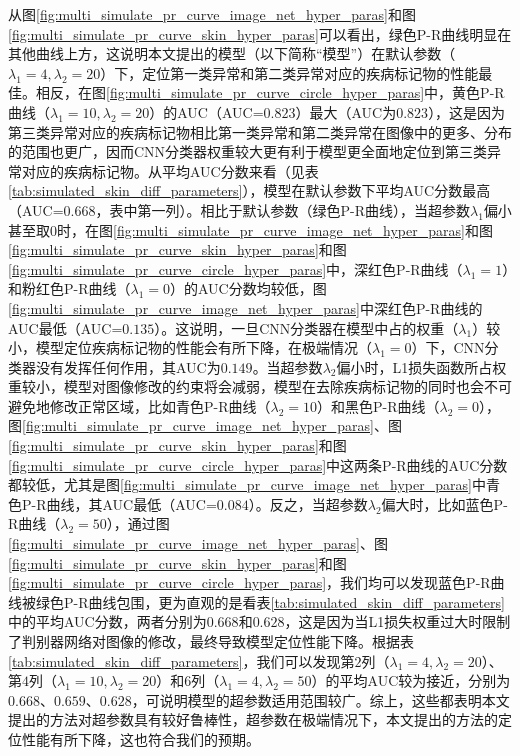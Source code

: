 从图\ref{fig:multi_simulate_pr_curve_image_net_hyper_paras}和图\ref{fig:multi_simulate_pr_curve_skin_hyper_paras}可以看出，绿色P-R曲线明显在其他曲线上方，这说明本文提出的模型（以下简称“模型”）在默认参数（$\lambda_{1}=4,\lambda_{2}=20$）下，定位第一类异常和第二类异常对应的疾病标记物的性能最佳。相反，在图\ref{fig:multi_simulate_pr_curve_circle_hyper_paras}中，黄色P-R曲线（$\lambda_{1}=10,\lambda_{2}=20$）的AUC（AUC=$0.823$）最大（AUC为$0.823$），这是因为第三类异常对应的疾病标记物相比第一类异常和第二类异常在图像中的更多、分布的范围也更广，因而CNN分类器权重较大更有利于模型更全面地定位到第三类异常对应的疾病标记物。从平均AUC分数来看（见表\ref{tab:simulated_skin_diff_parameters}），模型在默认参数下平均AUC分数最高（AUC=$0.668$，表中第一列）。相比于默认参数（绿色P-R曲线），当超参数$\lambda_{1}$偏小甚至取$0$时，在图\ref{fig:multi_simulate_pr_curve_image_net_hyper_paras}和图\ref{fig:multi_simulate_pr_curve_skin_hyper_paras}和图\ref{fig:multi_simulate_pr_curve_circle_hyper_paras}中，深红色P-R曲线（$\lambda_{1}=1$）和粉红色P-R曲线（$\lambda_{1}=0$）的AUC分数均较低，图\ref{fig:multi_simulate_pr_curve_image_net_hyper_paras}中深红色P-R曲线的AUC最低（AUC=$0.135$）。这说明，一旦CNN分类器在模型中占的权重（$\lambda_{1}$）较小，模型定位疾病标记物的性能会有所下降，在极端情况（$\lambda_{1}=0$）下，CNN分类器没有发挥任何作用，其AUC为$0.149$。当超参数$\lambda_{2}$偏小时，L1损失函数所占权重较小，模型对图像修改的约束将会减弱，模型在去除疾病标记物的同时也会不可避免地修改正常区域，比如青色P-R曲线（$\lambda_{2}=10$）和黑色P-R曲线（$\lambda_2=0$），图\ref{fig:multi_simulate_pr_curve_image_net_hyper_paras}、图\ref{fig:multi_simulate_pr_curve_skin_hyper_paras}和图\ref{fig:multi_simulate_pr_curve_circle_hyper_paras}中这两条P-R曲线的AUC分数都较低，尤其是图\ref{fig:multi_simulate_pr_curve_image_net_hyper_paras}中青色P-R曲线，其AUC最低（AUC=$0.084$）。反之，当超参数$\lambda_{2}$偏大时，比如蓝色P-R曲线（$\lambda_{2}=50$），通过图\ref{fig:multi_simulate_pr_curve_image_net_hyper_paras}、图\ref{fig:multi_simulate_pr_curve_skin_hyper_paras}和图\ref{fig:multi_simulate_pr_curve_circle_hyper_paras}，我们均可以发现蓝色P-R曲线被绿色P-R曲线包围，更为直观的是看表\ref{tab:simulated_skin_diff_parameters}中的平均AUC分数，两者分别为$0.668$和$0.628$，这是因为当L1损失权重过大时限制了判别器网络对图像的修改，最终导致模型定位性能下降。根据表\ref{tab:simulated_skin_diff_parameters}，我们可以发现第$2$列（$\lambda_{1}=4,\lambda_{2}=20$）、第$4$列（$\lambda_{1}=10,\lambda_{2}=20$）和$6$列（$\lambda_{1}=4,\lambda_{2}=50$）的平均AUC较为接近，分别为$0.668$、$0.659$、$0.628$，可说明模型的超参数适用范围较广。综上，这些都表明本文提出的方法对超参数具有较好鲁棒性，超参数在极端情况下，本文提出的方法的定位性能有所下降，这也符合我们的预期。
